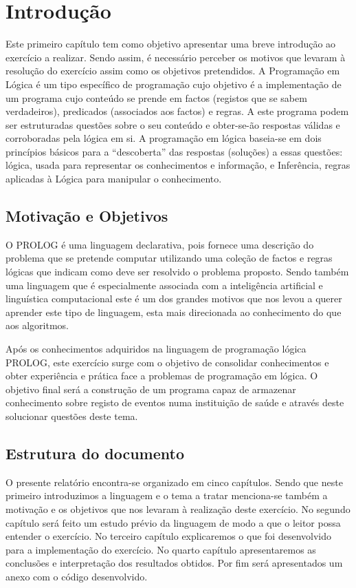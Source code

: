 \chapter{Introdução}
\label{cap:p1}
Este primeiro capítulo tem como objetivo apresentar uma breve introdução ao exercício a realizar. Sendo assim, é necessário perceber os motivos que levaram à resolução do exercício assim como os objetivos pretendidos.
A Programação em Lógica é um tipo específico de programação cujo objetivo é a implementação de um programa cujo conteúdo se prende em factos (registos que se sabem verdadeiros), predicados (associados aos factos) e regras. A este programa podem ser estruturadas questões sobre o seu conteúdo e obter-se-ão respostas válidas e corroboradas pela lógica em si.
A programação em lógica baseia-se em dois princípios básicos para a “descoberta” das respostas (soluções) a essas questões: lógica, usada para representar os conhecimentos e informação, e Inferência, regras aplicadas à Lógica para manipular o conhecimento.




\section{Motivação e Objetivos}
\label{p1:MotivObj}
O PROLOG é uma linguagem declarativa, pois fornece uma descrição do problema que se pretende computar utilizando uma coleção de factos e regras lógicas que indicam como deve ser resolvido o problema proposto. Sendo também uma linguagem que é especialmente associada com a inteligência artificial e linguística computacional este é um dos grandes motivos que nos levou a querer aprender este tipo de linguagem, esta mais direcionada ao conhecimento do que aos algoritmos. 


Após os conhecimentos adquiridos na linguagem de programação lógica PROLOG, este exercício surge com o objetivo de consolidar conhecimentos e obter experiência e prática face a problemas de programação em lógica. O objetivo final será a construção de um programa capaz de armazenar conhecimento sobre registo de eventos numa instituição de saúde e através deste solucionar questões deste tema.



\section{Estrutura do documento}
\label{p1:Estrutura}
O presente relatório encontra-se organizado em cinco capítulos. Sendo que neste primeiro introduzimos a linguagem e o tema a tratar menciona-se também a motivação e os objetivos que nos levaram à realização deste exercício. 
No segundo capítulo será feito um estudo prévio da linguagem de modo a que o leitor possa entender o exercício. No terceiro capítulo explicaremos o que foi desenvolvido para a implementação do exercício. No quarto capítulo apresentaremos as conclusões e interpretação dos resultados obtidos. Por fim será apresentados um anexo com o código desenvolvido. 




